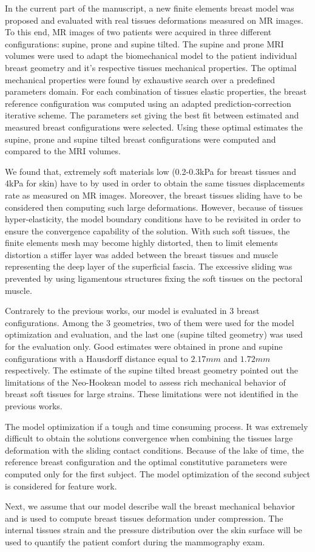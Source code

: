 In the current part of the manuscript, a new finite elements breast model was proposed and  evaluated with real tissues deformations measured on MR images. To this end, MR images of two patients were acquired in three different configurations: supine, prone and supine tilted. The supine and prone MRI volumes were used to adapt the biomechanical model to the patient individual breast geometry and it's respective tissues mechanical properties.  The optimal mechanical properties were found by exhaustive search over a predefined parameters domain. For each combination of tissues elastic properties,  the breast reference configuration was computed using an adapted prediction-correction iterative scheme. The parameters set giving the best fit between estimated and measured breast configurations were selected.  Using these optimal estimates the supine, prone and supine tilted breast configurations were computed and compared to the MRI volumes.

We found that, extremely soft materials low (0.2-0.3kPa for breast tissues and 4kPa for skin) have to by used in order to obtain the same tissues displacements rate as measured on MR images. Moreover, the breast tissues sliding have to be considered then computing such large deformations. However, because of tissues hyper-elasticity, the model boundary conditions have to be revisited in order to ensure the convergence capability of the solution. With such soft tissues, the finite elements mesh may become highly distorted, then to limit elements distortion a stiffer layer was added between the breast tissues and muscle representing the deep layer of the superficial fascia. The excessive  sliding was prevented by using ligamentous structures fixing the soft tissues on the pectoral muscle.

Contrarely to the previous works, our model is evaluated in 3 breast configurations. Among the 3 geometries, two of them were used for the model optimization and evaluation, and the last one (supine tilted geometry) was used for the evaluation only. Good estimates were obtained in prone and supine configurations with a Hausdorff distance equal to $2.17 mm$ and $1.72 mm$ respectively.  The estimate of the supine tilted breast geometry pointed out the limitations of the Neo-Hookean model to assess rich mechanical behavior of breast soft tissues for large strains. These limitations were not identified in the previous works. 

The model optimization if a tough and time consuming process. It was extremely difficult to obtain the solutions convergence when combining the tissues large deformation with the sliding contact conditions. Because of the lake of time, the reference breast configuration and the optimal constitutive parameters were computed only for the first subject. The model optimization of the second subject is considered for feature work.

Next, we assume that our model describe wall the breast mechanical behavior and  is used to compute breast tissues deformation under compression. The internal tissues strain and the pressure distribution over the skin surface will be used to quantify the patient comfort during the mammography exam. 